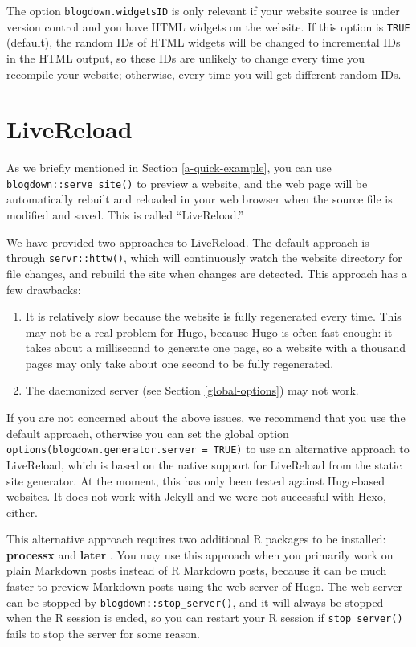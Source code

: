 \documentclass[12pt,]{krantz}
\theoremstyle{definition}
\theoremstyle{definition}
\theoremstyle{definition}
\theoremstyle{remark}
\begin{document}
The option \texttt{blogdown.widgetsID} is only relevant if your website
source is under version control and you have HTML widgets on the
website. If this option is \texttt{TRUE} (default), the random IDs of
HTML widgets will be changed to incremental IDs in the HTML output, so
these IDs are unlikely to change every time you recompile your website;
otherwise, every time you will get different random IDs.

\section{LiveReload}\label{livereload}

As we briefly mentioned in Section
\ref{a-quick-example}, you can use \texttt{blogdown::serve\_site()} to
preview a website, and the web page will be automatically rebuilt and
reloaded in your web browser when the source file is modified and saved.
This is called ``LiveReload.''

We have provided two approaches to LiveReload. The default approach is
through \texttt{servr::httw()}, which will continuously watch the
website directory for file changes, and rebuild the site when changes
are detected. This approach has a few drawbacks:

\begin{enumerate}
\def\labelenumi{\arabic{enumi}.}
\item
  It is relatively slow because the website is fully regenerated every
  time. This may not be a real problem for Hugo, because Hugo is often
  fast enough: it takes about a millisecond to generate one page, so a
  website with a thousand pages may only take about one second to be
  fully regenerated.
\item
  The daemonized server (see Section \ref{global-options}) may not work.
\end{enumerate}

If you are not concerned about the above issues, we recommend that you
use the default approach, otherwise you can set the global option
\texttt{options(blogdown.generator.server\ =\ TRUE)} to use an
alternative approach to LiveReload, which is based on the native support
for LiveReload from the static site generator. At the moment, this has
only been tested against Hugo-based websites. It does not work with
Jekyll and we were not successful with Hexo, either.

This alternative approach requires two additional R packages to be
installed: \textbf{processx} \citep{R-processx} and \textbf{later}
\citep{R-later}. You may use this approach when you primarily work on
plain Markdown posts instead of R Markdown posts, because it can be much
faster to preview Markdown posts using the web server of Hugo. The web
server can be stopped by \texttt{blogdown::stop\_server()}, and it will
always be stopped when the R session is ended, so you can restart your R
session if \texttt{stop\_server()} fails to stop the server for some
reason.
\end{document}
